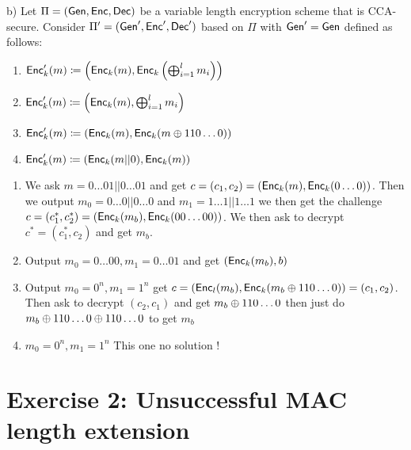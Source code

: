 \documentclass[12pt]{article}
\begin{document}
b) Let $\Pi = (\operatorname{\mathsf{Gen}}, \operatorname{\mathsf{Enc}}, \operatorname{\mathsf{Dec}})$ be a variable length encryption scheme that is CCA-secure. Consider $\Pi' = (\operatorname{\mathsf{Gen}}', \operatorname{\mathsf{Enc}}', \operatorname{\mathsf{Dec}}')$ based on $\Pi$ with $\operatorname{\mathsf{Gen}}'=\operatorname{\mathsf{Gen}}$ defined as follows:
\begin{enumerate}
	\item $\operatorname{\mathsf{Enc}}'_k(m) \coloneqq \left(\operatorname{\mathsf{Enc}}_k(m), \operatorname{\mathsf{Enc}}_k\left(\bigoplus_{i=1}^l m_i\right)\right)$
	\item $\operatorname{\mathsf{Enc}}'_k(m) \coloneqq \left(\operatorname{\mathsf{Enc}}_k(m), \bigoplus_{i=1}^l m_i\right) $
	\item $\operatorname{\mathsf{Enc}}'_k(m) \coloneqq (\operatorname{\mathsf{Enc}}_k(m), \operatorname{\mathsf{Enc}}_k(m \oplus 110\dots0))$
	\item $\operatorname{\mathsf{Enc}}'_k(m) \coloneqq (\operatorname{\mathsf{Enc}}_k(m||0), \operatorname{\mathsf{Enc}}_k(m))$
\end{enumerate}
\begin{enumerate}
\item We ask $m=0\dots01 || 0\dots01$ and get $c=(c_1, c_2)=(\operatorname{\mathsf{Enc}}_k(m), \operatorname{\mathsf{Enc}}_k(0\dots0))$. Then we output $m_0=0\dots0||0\dots0$ and $m_1=1\dots1||1\dots1$ we then get the challenge $c=(c^*_1, c^*_2)=(\operatorname{\mathsf{Enc}}_k(m_b), \operatorname{\mathsf{Enc}}_k(00\dots00))$. We then ask to decrypt $c^*=(c^*_1, c_2)$ and get $m_b$.

\item Output $m_0=0\dots00, m_1=0\dots01$ and get $(\operatorname{\mathsf{Enc}}_k(m_b),b)$

\item Output $m_0=0^n, m_1=1^n$ get $c=(\operatorname{\mathsf{Enc}}_l(m_b), \operatorname{\mathsf{Enc}}_k(m_b\oplus 110\dots0)) = (c_1,c_2)$. Then ask to decrypt $(c_2,c_1)$ and get $m_b\oplus 110\dots0$ then just do $m_b\oplus 110\dots0 \oplus 110\dots0$ to get $m_b$

\item $m_0=0^n, m_1=1^n$ This one no solution ! 

\end{enumerate}


\section{Exercise 2: Unsuccessful MAC length extension}
\end{document}
